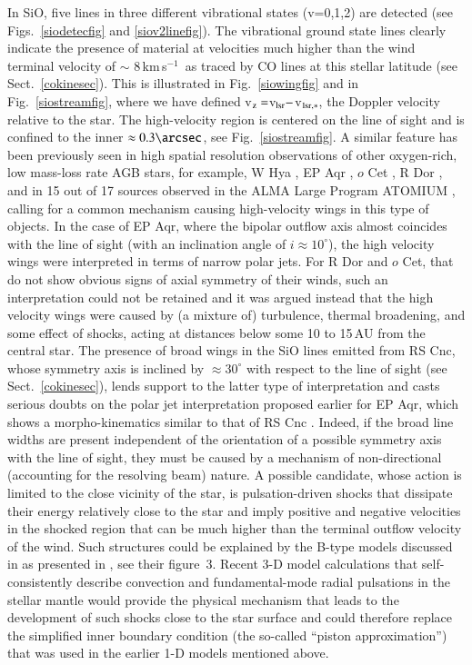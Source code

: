 \documentclass{aa}
\newcommand{\kms}{\,km\,s$^{-1}$~}
\begin{document}
In SiO, five lines in three different vibrational states (v=0,1,2) are
detected (see  Figs.~\ref{siodetecfig} and \ref{siov2linefig}). The
vibrational ground state lines clearly indicate the presence of
material at velocities much higher than the wind terminal velocity of
$\sim$ 8\kms as traced by CO lines  at this stellar latitude (see
Sect.~\ref{cokinesec}). This is illustrated in  Fig.~\ref{siowingfig}
and in Fig.~\ref{siostreamfig}, where we have defined v$_{\rm
z}=$v$_{\rm lsr}-$v$_{\rm lsr,*}$, the Doppler velocity relative to
the star. The high-velocity region is centered on the line of sight
and is confined to the inner $\approx 0.3\arcsec$, see
Fig.~\ref{siostreamfig}.  A similar feature has been previously seen
in high spatial resolution observations of other oxygen-rich, low
mass-loss rate AGB stars, for example, W Hya \citep{2017NatAs...1..848V}, EP
Aqr \citep{thnetal2019}, $o$ Cet \citep{htnetal2020}, R Dor
\citep{drdhn2018,nhtmnras2019,nhungetal2021}, and in 15 out of 17
sources observed in the ALMA Large Program ATOMIUM
\citep{dmrgh2020,atomium1}, calling for a common mechanism causing
high-velocity wings in this type of objects. In the case of EP Aqr,
where the bipolar outflow axis almost coincides with the line of sight
(with an inclination angle of $i \approx 10^{\circ}$), the high
velocity wings were interpreted in terms of narrow polar jets. For R
Dor and $o$ Cet, that do not show obvious signs of axial symmetry of
their winds, such an interpretation could not be retained and it was
argued instead that the high velocity wings were caused by (a mixture
of) turbulence, thermal broadening, and some effect of shocks, acting
at distances below some 10 to 15\,AU from the central star. The
presence of broad wings in the SiO lines emitted from RS Cnc, whose
symmetry axis is inclined by $\approx 30^{\circ}$ with respect to the
line of sight (see Sect.~\ref{cokinesec}), lends support to the latter
type of interpretation and casts serious doubts on the polar jet
interpretation proposed earlier for EP Aqr, which shows a
morpho-kinematics similar to that of RS Cnc \citep{nhwetal2015}.
Indeed, if the broad line widths are  present independent of the
orientation of a possible symmetry axis with the line of sight, they
must be caused by a mechanism of non-directional (accounting for the
resolving beam) nature.  A possible candidate, whose action is limited
to the close vicinity of the star, is pulsation-driven shocks that
dissipate their energy relatively close to the star and imply positive
and negative velocities in the shocked region that can be much higher
than the terminal outflow velocity of the wind. Such structures could
be explained by the B-type models discussed in \citet{wljhs2000} as
presented in \citet{wlnoj2002}, see their figure~3.  Recent 3-D
model calculations that self-consistently describe convection and
fundamental-mode radial pulsations in the stellar mantle would provide
the physical mechanism that leads to the development of such shocks
close to the star surface \cite[e.g.,][]{flh2017} and could therefore
replace the simplified inner boundary condition (the so-called
``piston approximation'') that was used in the earlier 1-D models
mentioned above.
\end{document}
